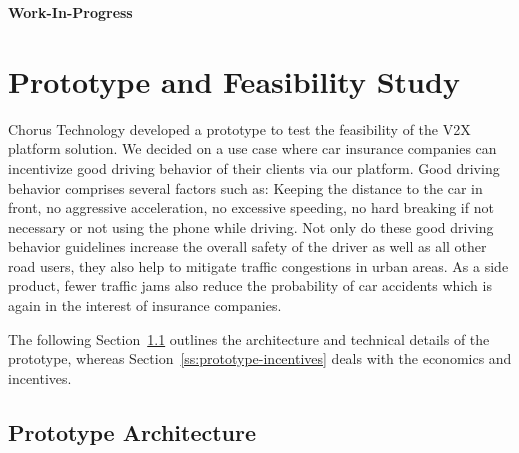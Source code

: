 \documentclass{llncs}
\begin{document}
{			\textbf{Work-In-Progress}
			
					


	\section{Prototype and Feasibility Study}
		\label{s:section-6}	
			
		Chorus Technology developed a prototype to test the feasibility of the V2X platform solution. We decided on a use case where car insurance companies can incentivize good driving behavior of their clients via our platform. Good driving behavior comprises several factors such as: Keeping the distance to the car in front, no aggressive acceleration, no excessive speeding, no hard breaking if not necessary or not using the phone while driving. Not only do these good driving behavior guidelines increase the overall safety of the driver as well as all other road users, they also help to mitigate traffic congestions in urban areas. As a side product, fewer traffic jams also reduce the probability of car accidents which is again in the interest of insurance companies.
		
		The following Section~\ref{ss:protoype-architecture} outlines the architecture and technical details of the prototype, whereas Section~\ref{ss:prototype-incentives} deals with the economics and incentives.
		
%		
%		
%		
%		

%		
%		
		
		\subsection{Prototype Architecture}
			\label{ss:protoype-architecture}				

}
\end{document}
